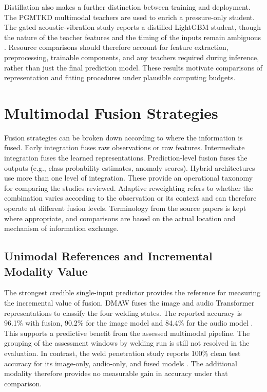 Distillation also makes a further distinction between training and deployment. The PGMTKD multimodal
teachers are used to enrich a pressure-only student. The gated acoustic-vibration study reports a
distilled LightGBM student, though the nature of the teacher features and the timing of the inputs
remain ambiguous \parencite{Li2025PGMTKD,Huang2026Rolling}.
Resource comparisons should therefore account for feature extraction, preprocessing, trainable
components, and any teachers required during inference, rather than just the final prediction model.
These results motivate comparisons of representation and fitting procedures under plausible computing budgets.

\section{Multimodal Fusion Strategies}

Fusion strategies can be broken down according to where the information is fused. Early integration
fuses raw observations or raw features. Intermediate integration fuses the learned representations.
Prediction-level fusion fuses the outputs (e.g., class probability estimates, anomaly scores).
Hybrid architectures use more than one level of integration.
These provide an operational taxonomy for comparing the studies reviewed. Adaptive reweighting
refers to whether the combination varies according to the observation or its context and can
therefore operate at different fusion levels.
Terminology from the source papers is kept where appropriate, and comparisons are based on the
actual location and mechanism of information exchange.

\subsection{Unimodal References and Incremental Modality Value}

The strongest credible single-input predictor provides the reference for measuring the incremental value of fusion.
DMAW fuses the image and
audio Transformer representations to classify the four welding states. The reported accuracy is
96.1\% with fusion, 90.2\% for the image model and 84.4\% for the audio model \parencite[Table~III]{P003}.
This supports a predictive benefit from the assessed multimodal pipeline. The grouping of the
assessment windows by welding run is still not resolved in the evaluation.
In contrast, the weld penetration study reports 100\% clean test accuracy for its image-only,
audio-only, and fused models \parencite[Tables~1--3]{Hua2026Weld}.
The additional modality therefore provides no measurable gain in accuracy under that comparison.

